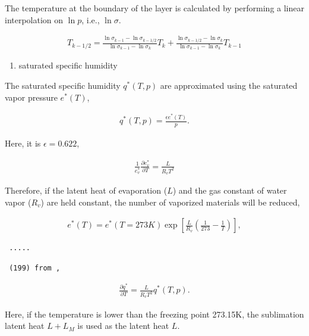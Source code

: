 The temperature at the boundary of the layer is calculated by performing
a linear interpolation on \(\ln p\), i.e., \(\ln \sigma\).

\begin{eqnarray}
  T_{k-1/2} = \frac{\ln \sigma_{k-1} - \ln \sigma_{k-1/2}}
                   {\ln \sigma_{k-1} - \ln \sigma_k      } T_k
            + \frac{\ln \sigma_{k-1/2} - \ln \sigma_k}
                   {\ln \sigma_{k-1} - \ln \sigma_k      } T_{k-1}
\end{eqnarray}

\begin{enumerate}
\def\labelenumi{\arabic{enumi}.}
\setcounter{enumi}{4}
\tightlist
\item
  saturated specific humidity
\end{enumerate}

The saturated specific humidity \(q^*(T,p)\) are approximated using the
saturated vapor pressure \(e^*(T)\),

\begin{eqnarray}
q^*(T,p) = \frac{\epsilon e^*(T)}{p} .
\end{eqnarray}

Here, it is \(\epsilon=0.622\),

\begin{eqnarray}
\frac{1}{e^*_v} \frac{\partial{e^*_v}}{\partial {T}} = \frac{L}{R_v T^2}
\end{eqnarray}

Therefore, if the latent heat of evaporation (\(L\)) and the gas
constant of water vapor (\(R_v\)) are held constant, the number of
vaporized materials will be reduced,

\begin{eqnarray}
  e^*(T) = e^*(T=273{K})
                      \exp \left[ \frac{L}{R_v}
                            \left( \frac{1}{273} - \frac{1}{T} \right)
                       \right] ,
\end{eqnarray}

\begin{verbatim}
 .....

 (199) from ,
\end{verbatim}

\begin{eqnarray}
\frac{\partial{q^*}}{\partial {T}} = \frac{L}{R_v T^2} q^*(T,p) .
\end{eqnarray}

Here, if the temperature is lower than the freezing point 273.15K, the
sublimation latent heat \(L+L_M\) is used as the latent heat \(L\).


